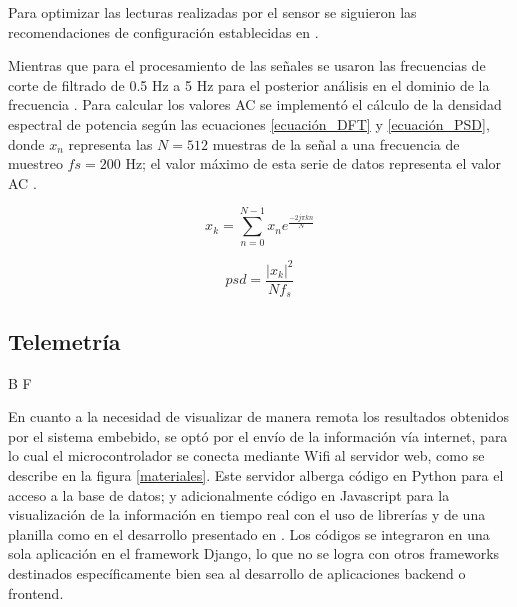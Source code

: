 \documentclass[journal]{IEEEtran}
\begin{document}
Para optimizar las lecturas realizadas por el sensor se siguieron las recomendaciones de configuración establecidas en \cite{E_Recomended_configurations_MAX30102_maxim} \cite{E_SNR_MAX30102}. {\color{green}Mientras que para el procesamiento de las señales se usaron las frecuencias de corte de filtrado de 0.5 Hz a 5 Hz para el posterior análisis en el dominio de la frecuencia \cite{E_FFT_Spo2}. Para calcular los valores AC se implementó el cálculo de la densidad espectral de potencia según las ecuaciones \ref{ecuación_DFT} y \ref{ecuación_PSD}, donde $x_{n}$ representa las $N=512$ muestras de la señal a una frecuencia de muestreo $fs=200$ Hz; el valor máximo de esta serie de datos representa el valor AC \cite{E_psd_ppg}.


\begin{equation}
	x_{k}=\sum_{n=0}^{N-1}x_{n}e^{\frac{-2j{\pi}kn}{N}}
	\label{ecuación_DFT}
\end{equation}	

\begin{equation}
	psd=\frac{|x_{k}|^2}{Nf_{s}}
	\label{ecuación_PSD}
\end{equation}
	
}

\subsection{Telemetría}

{\color{blue}B F}


En cuanto a la necesidad de visualizar de manera remota los resultados obtenidos por el sistema embebido, se optó por el envío de la información vía internet, para lo cual el microcontrolador se conecta mediante Wifi al servidor web, como se describe en la figura \ref{materiales}. Este servidor  alberga código en Python para el acceso a la base de datos; y adicionalmente código en Javascript para la visualización de la información en tiempo real con el uso de librerías y de una planilla como en el desarrollo presentado en \cite{F_iot_spo2_wrist}. Los códigos se integraron en una sola aplicación en el framework Django, lo que no se logra con otros frameworks destinados específicamente bien sea al desarrollo de aplicaciones backend o frontend.

 
\end{document}
